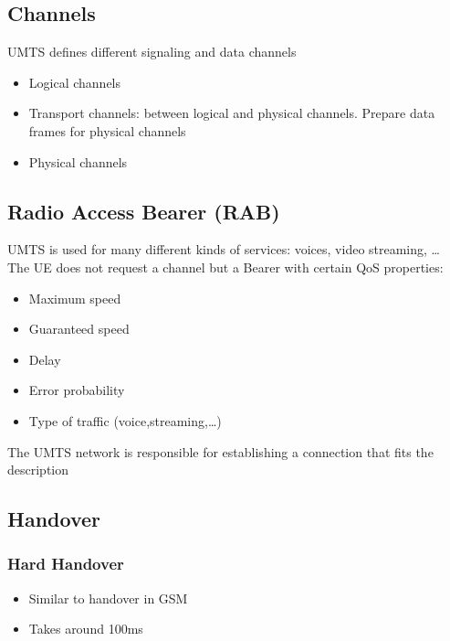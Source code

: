 
\subsection{Channels}
UMTS defines different signaling and data channels
\begin{itemize}
	\item Logical channels
	\item Transport channels: between logical and physical channels.
	Prepare data frames for physical channels
	\item Physical channels
\end{itemize}

\subsection{Radio Access Bearer (RAB)}
UMTS is used for many different kinds of services: voices, video streaming, \ldots\\
The UE does not request a channel but a Bearer with certain QoS properties:
\begin{itemize}
	\item Maximum speed
	\item Guaranteed speed
	\item Delay
	\item Error probability
	\item Type of traffic (voice,streaming,\ldots)
\end{itemize}
The UMTS network is responsible for establishing a connection that fits the 
description

\subsection{Handover}
\subsubsection{Hard Handover}
\begin{itemize}
	\item Similar to handover in GSM
	\item Takes around 100ms
\end{itemize}
